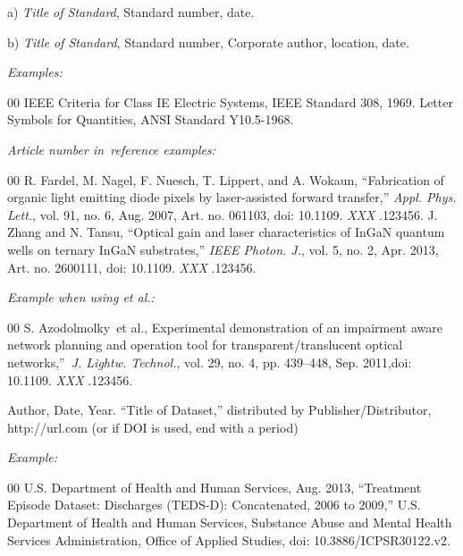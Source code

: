 \documentclass{ieeetj}
\begin{document}
\noindent a) {\it Title of Standard}, Standard number, date.

\noindent b) {\it Title of Standard}, Standard number, Corporate author, location, date.

{\it Examples:}

\begin{thebibliography}{00}
 IEEE Criteria for Class IE Electric Systems, IEEE Standard 308, 1969.
 Letter Symbols for Quantities, ANSI Standard Y10.5-1968.
\end{thebibliography}

{\it Article number in~reference examples:}

\begin{thebibliography}{00}
 R. Fardel, M. Nagel, F. Nuesch, T. Lippert, and A. Wokaun, ``Fabrication of organic light emitting diode pixels by laser-assisted forward transfer,'' {\it Appl. Phys. Lett.}, vol. 91, no. 6, Aug. 2007, Art. no. 061103, doi:  {10.1109.} {{\it XXX}} {.123456}.
 J. Zhang and N. Tansu, ``Optical gain and laser characteristics of InGaN quantum wells on ternary InGaN substrates,'' {\it IEEE Photon. J.}, vol. 5, no. 2, Apr. 2013, Art. no. 2600111, doi:  {10.1109.} {{\it XXX}} {.123456}.
\end{thebibliography}

{\it Example when using \textit{et al.}:}

\begin{thebibliography}{00}
 S. Azodolmolky~{{et al.}}, Experimental demonstration of an impairment aware network planning and operation tool for transparent/translucent optical networks,''~{\it J. Lightw. Technol.}, vol. 29, no. 4, pp. 439--448, Sep. 2011,doi:  {10.1109.} {{\it XXX}} {.123456}.
\end{thebibliography}


\noindent Author,  Date, Year. ``Title of Dataset,'' distributed by Publisher/Distributor, http://url.com (or if DOI is used, end with a period)

{\it Example:}

\begin{thebibliography}{00}
 U.S. Department of Health and Human Services, Aug. 2013, ``Treatment Episode Dataset: Discharges (TEDS-D): Concatenated, 2006 to 2009,'' U.S. Department of Health and Human Services, Substance Abuse and Mental Health Services Administration, Office of Applied Studies, doi: 10.3886/ICPSR30122.v2.
\end{thebibliography}
\end{document}
